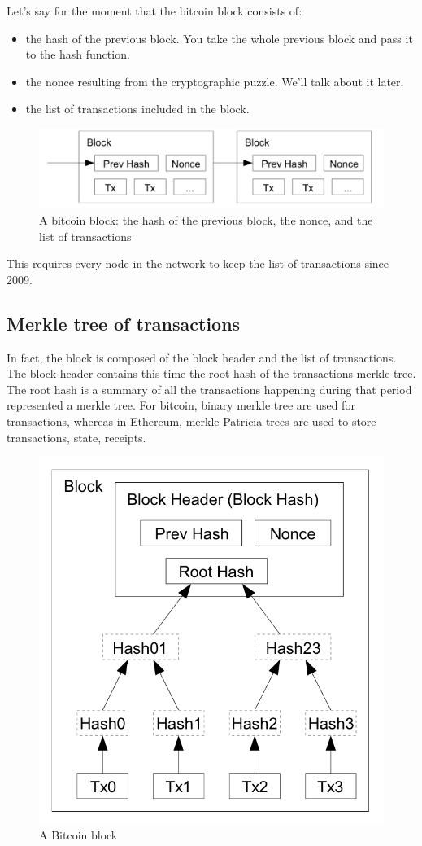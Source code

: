 Let's say for the moment that the bitcoin block consists of:
\begin{itemize}
    \item the hash of the previous block. You take the whole previous block and pass it to the hash function.
    \item the nonce resulting from the cryptographic puzzle. We'll talk about it later. 
    \item the list of transactions included in the block.
\end{itemize}
\begin{figure}[H]
    \centering
\includegraphics[width=0.6\linewidth]{background/block.png}
    \caption{A bitcoin block: the hash of the previous block, the nonce, and the list of transactions}
    \label{fig:block}
\end{figure}

This requires every node in the network to keep the list of transactions since 2009.

\subsection{Merkle tree of transactions}
In fact, the block is composed of the block header and the list of transactions. The block header contains this time the root hash of the transactions merkle tree.
The root hash is a summary of all the transactions happening during that period represented a merkle tree. For bitcoin, binary merkle tree are used for transactions, whereas in Ethereum, merkle Patricia trees are used to store transactions, state, receipts. 
\begin{figure}[H]
    \centering
\includegraphics[width=0.4\linewidth]{background/blockmerkle.png}
    \caption{A Bitcoin\cite{Nakamoto..09} block}
    \label{fig:blockmerkle}
\end{figure}

